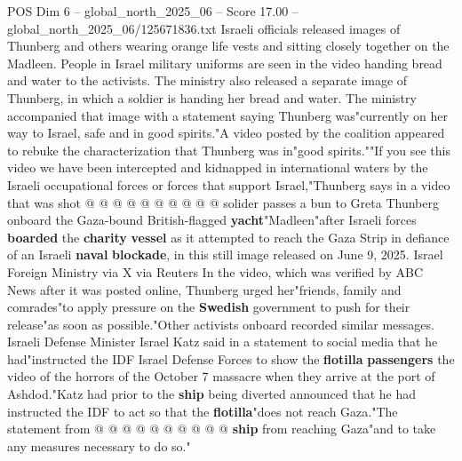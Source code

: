 \begin{textsample}{POS Dim 6 – global\_north\_2025\_06 – Score 17.00 – global\_north\_2025\_06/125671836.txt}
Israeli officials released images of Thunberg and others wearing orange life vests and sitting closely together on the Madleen.
People in Israel military uniforms are seen in the video handing bread and water to the activists.
The ministry also released a separate image of Thunberg, in which a soldier is handing her bread and water.
The ministry accompanied that image with a statement saying Thunberg was"currently on her way to Israel, safe and in good spirits."A video posted by the coalition appeared to rebuke the characterization that Thunberg was in"good spirits.""If you see this video we have been intercepted and kidnapped in international waters by the Israeli occupational forces or forces that support Israel,"Thunberg says in a video that was shot @ @ @ @ @ @ @ @ @ @ solider passes a bun to Greta Thunberg onboard the Gaza-bound British-flagged \textbf{yacht}"Madleen"after Israeli forces \textbf{boarded} the \textbf{charity} \textbf{vessel} as it attempted to reach the Gaza Strip in defiance of an Israeli \textbf{naval} \textbf{blockade}, in this still image released on June 9, 2025.
Israel Foreign Ministry via X via Reuters In the video, which was verified by ABC News after it was posted online, Thunberg urged her"friends, family and comrades"to apply pressure on the \textbf{Swedish} government to push for their release"as soon as possible."Other activists onboard recorded similar messages.
Israeli Defense Minister Israel Katz said in a statement to social media that he had"instructed the IDF Israel Defense Forces to show the \textbf{flotilla} \textbf{passengers} the video of the horrors of the October 7 massacre when they arrive at the port of Ashdod."Katz had prior to the \textbf{ship} being diverted announced that he had instructed the IDF to act so that the \textbf{flotilla}"does not reach Gaza."The statement from @ @ @ @ @ @ @ @ @ @ \textbf{ship} from reaching Gaza"and to take any measures necessary to do so."

\end{textsample}
